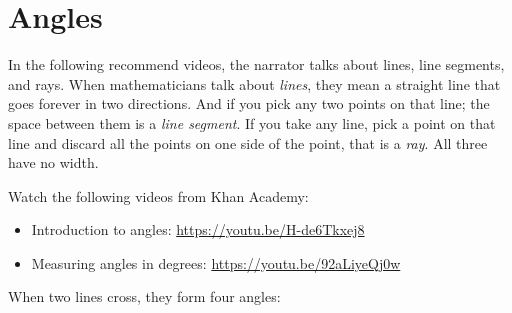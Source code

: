 \chapter{Angles}

In the following recommend videos, the narrator talks about
lines, line segments, and rays. When mathematicians talk about
\emph{lines}, they mean a straight line that goes forever in two 
directions. And if you pick any two points on that line; the space between 
them is a \emph{line segment}. If you take any line, pick 
a point on that line and discard all the points on one side of the point, that 
is a \emph{ray}. All three have no width.

\begin{center}
\hspace{10mm}
\hspace{6mm}
\end{center}



Watch the following videos from Khan Academy:
\begin{itemize}
\item Introduction to angles: \url{https://youtu.be/H-de6Tkxej8}
\item Measuring angles in degrees: \url{https://youtu.be/92aLiyeQj0w} 
\end{itemize}

When two lines cross, they form four angles:

